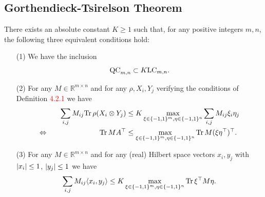 \subsection{Gorthendieck-Tsirelson Theorem}\frame{\tableofcontents[currentsubsection]}
	\begin{frame}
		\begin{theo}
			There exists an absolute constant $K\geq 1$ such that, for any positive integers $m,n$, the following three equivalent conditions hold:
			\begin{itemize}
				\item[(1)] We have the inclusion 
					\begin{equation}
						\textup{QC}_{m,n} \subset K\textup{LC}_{m,n}.
					\end{equation}
				\item[(2)] For any $M\in\mathbb{R}^{m\times n}$ and for any $\rho,X_i,Y_j$ verifying the conditions of Definition \textcolor{red}{4.2.1} we have
					\begin{align}
						\sum_{i,j} M_{ij} \textup{Tr} \, {\rho(X_i\otimes Y_j)}  &\leq K \max_{\xi\in\{-1,1\}^m,\eta\in\{-1,1\}^n} \sum_{i,j} M_{ij}\xi_i\eta_j \\
						\Leftrightarrow \hspace{2.5cm} \textup{Tr} \, {MA^\top}  &\leq \max_{\xi\in\{-1,1\}^m,\eta\in\{-1,1\}^n} \textup{Tr} \, {M(\xi\eta^\top)^\top} .
					\end{align}
					\item[(3)] For any $M\in\mathbb{R}^{m\times n}$ and for any (real) Hilbert space vectors $x_i,y_j$ with ${\left|{x_i}\right|}\leq 1$, ${\left|{y_j}\right|}\leq 1$ we have
						\begin{equation}
							\sum_{i,j} M_{ij}\langle{x_i},{y_j}\rangle \leq K \max_{\xi\in\{-1,1\}^m,\eta\in\{-1,1\}^n} \textup{Tr} \, {\xi^\top M \eta} . \label{eq:G_ineq}
						\end{equation}
			\end{itemize}
		\end{theo}
	\end{frame}
